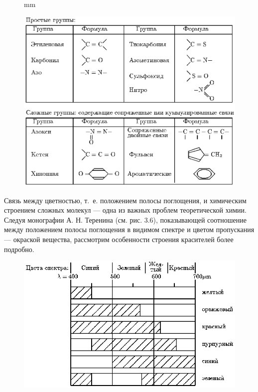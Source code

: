 \begin{figure}[tbp]
 mm
\centerline{\hbox{\hspace{7mm}\includegraphics[scale=0.9]{Ris/ris_eps/ris3_05d.eps}}}
\end{figure}

Связь между цветностью, т.~е. положением полосы
поглощения, и химическим строением сложных молекул --- одна из
важных проблем теоретической химии. Следуя монографии А. Н.
Теренина (см. рис. 3.6), показывающей соотношение между положением
полосы поглощения в видимом спектре и цветом пропускания ---
окраской вещества, рассмотрим особенности строения красителей
более подробно.

\begin{figure}[tbp]
\centerline{\hbox{\includegraphics[scale=1.0]{Ris/ris_eps/ris3_06.eps}}}

\end{figure}


